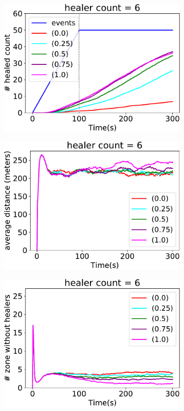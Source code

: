 \begin{figure}[t!]
\begin{subfigure}[b]{0.32\textwidth}
\includegraphics[width=\textwidth]{papers/mdpi2020/imgs/healed-6.pdf}
\end{subfigure}
\hfill
%
\begin{subfigure}[b]{0.32\textwidth}
\centering
\includegraphics[width=\textwidth]{papers/mdpi2020/imgs/avg-distance-from-leader-6.pdf}
\end{subfigure}
\hfill
%
\begin{subfigure}[b]{0.32\textwidth}
\centering
\includegraphics[width=\textwidth]{papers/mdpi2020/imgs/empty-zone-6.pdf}

\end{subfigure}
\end{figure}
